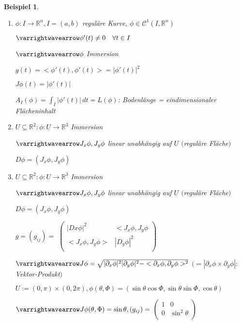 \documentclass[11pt]{memoir}
\theoremstyle{changebreak}
\newtheorem{Beispiel}{Beispiel}[chapter]
\begin{document}
\begin{Beispiel}
\begin{enumerate}
	\item $\phi: I \rightarrow \mathbb R^n, I = (a, b)$ reguläre Kurve, $\phi \in \mathscr C^1(I, \mathbb R^n)$ 
	\par
	$\varrightwavearrow \phi'(t) \ne 0 \quad \forall t\in I $
	\par
	$\varrightwavearrow \phi$ Immersion 
	\par
	$g(t) = <\phi'(t), \phi'(t) > = |\phi'(t)|^2$ 
	\par
	$J\phi(t) = |\phi'(t)|$ 
	\par
	$A_I(\phi) = \int_I |\phi'(t)|\, dt = L(\phi)$: Bodenlänge = eindimensionaler Flächeninhalt

	\item $U \subseteq \mathbb R^2: \phi: U \rightarrow \mathbb R^3$ Immersion 
	\par
	$\varrightwavearrow J_x \phi, J_y \phi$ linear unabhängig auf $U$ $($reguläre Fläche$)$
	\par
	$D\phi = (J_x \phi, J_y \phi)$ \\
	
	\item $U \subseteq \mathbb R^2: \phi: U \rightarrow \mathbb R^3$ Immersion 
	\par
	$\varrightwavearrow J_x \phi, J_y \phi$ linear unabhängig auf $U$ $($reguläre Fläche$)$
	\par
	$D\phi = (J_x \phi, J_y \phi)$ 
	\par
	$g= (g_{ij}) =$
	$\begin{pmatrix}
      		|Dx\phi|^2 & 	<J_x\phi, J_y\phi \\
      		<J_x\phi, J_y\phi> &  	|D_y\phi|^2 \\
	\end{pmatrix}$ 
	\par\bigskip
	$\varrightwavearrow J\phi = \sqrt{|\partial_x \phi|^2 |\partial_y \phi|^2 - <\partial_x\phi, \partial_y\phi>^2}$ $(= |\partial_x\phi \times \partial_y \phi|: $Vektor-Produkt$)$ 
	\par
	$U:= (0, \pi) \times (0, 2\pi), \phi(\theta, \Phi) = (\sin\theta\cos\Phi, \sin\theta\sin\Phi, \cos\theta)$ 
	\par
	$\varrightwavearrow J\phi(\theta, \Phi) = \sin\theta, (g_{ij}) = $
	$\begin{pmatrix}
		1 & 0 \\
		0 & \sin^2 \theta \\
	\end{pmatrix}$


\end{enumerate}
\end{Beispiel}
\end{document}
